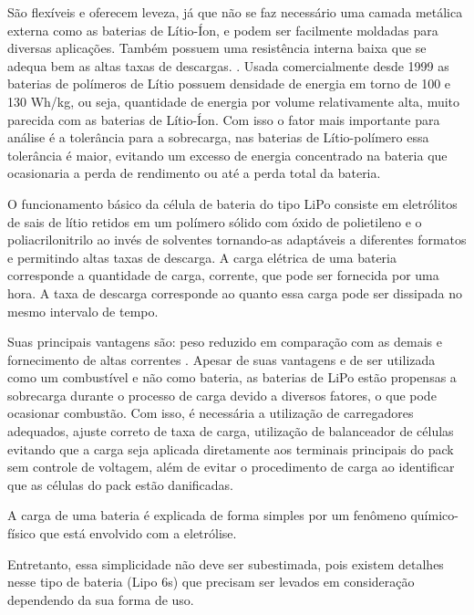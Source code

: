 São flexíveis e oferecem leveza, já que não se faz necessário uma camada metálica externa como as baterias de 
Lítio-Íon, e podem ser facilmente moldadas para diversas aplicações. Também possuem uma resistência interna 
baixa que se adequa bem as altas taxas de descargas. \cite{costa}. Usada comercialmente desde 1999 as baterias 
de polímeros de Lítio possuem densidade de energia em torno de 100 e 130 Wh/kg, ou seja, quantidade de energia 
por volume relativamente alta, muito parecida com as baterias de Lítio-Íon. Com isso o fator mais importante para
análise é a tolerância para a sobrecarga, nas baterias de Lítio-polímero essa tolerância é maior, evitando um 
excesso de energia concentrado na bateria que ocasionaria a perda de rendimento ou até a perda total da bateria.
\cite{costa}


O funcionamento básico da célula de bateria do tipo LiPo consiste em eletrólitos de sais de lítio retidos
em um polímero sólido com óxido de polietileno e o poliacrilonitrilo ao invés de solventes tornando-as
adaptáveis a diferentes formatos e permitindo altas taxas de descarga. A carga elétrica de uma bateria
corresponde a quantidade de carga, corrente, que pode ser fornecida por uma hora. 
A taxa de descarga corresponde ao quanto essa carga pode ser dissipada no mesmo intervalo de tempo. \cite{gibbs}

Suas principais vantagens são: peso reduzido em comparação com as demais e fornecimento de altas correntes 
\cite{pinto}. Apesar de suas vantagens e de ser utilizada como um combustível e não como bateria,
as baterias de LiPo estão propensas a sobrecarga durante o processo de carga devido a diversos fatores, 
o que pode ocasionar combustão. Com isso, é necessária a utilização de carregadores adequados, ajuste correto 
de taxa de carga, utilização de balanceador de células evitando que a carga seja aplicada diretamente aos 
terminais principais do pack sem controle de voltagem, além de evitar o procedimento de carga ao identificar 
que as células do pack estão danificadas. \cite{gibbs}


A carga de uma bateria é explicada de forma simples por um fenômeno químico-físico que está envolvido com a eletrólise. \cite{gibbs}

Entretanto, essa simplicidade não deve ser subestimada, pois existem detalhes nesse tipo de bateria (Lipo 6s) que precisam ser levados em consideração dependendo da sua forma de uso.

